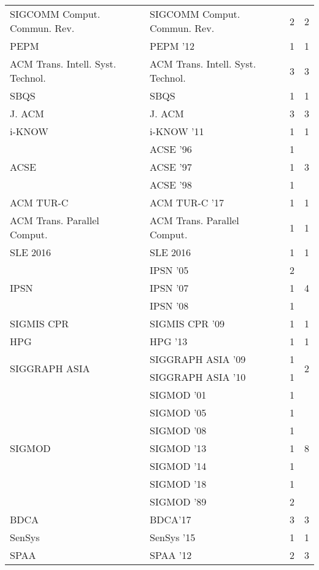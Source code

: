 \begin{table*}[t]
\begin{tabular}{llrr}
\multirow{1}{*}{SIGCOMM Comput. Commun. Rev.} & SIGCOMM Comput. Commun. Rev. & 2 & \multirow{1}{*}{2}\\
\multirow{1}{*}{PEPM } & PEPM '12 & 1 & \multirow{1}{*}{1}\\
\multirow{1}{*}{ACM Trans. Intell. Syst. Technol.} & ACM Trans. Intell. Syst. Technol. & 3 & \multirow{1}{*}{3}\\
\multirow{1}{*}{SBQS} & SBQS & 1 & \multirow{1}{*}{1}\\
\multirow{1}{*}{J. ACM} & J. ACM & 3 & \multirow{1}{*}{3}\\
\multirow{1}{*}{i-KNOW } & i-KNOW '11 & 1 & \multirow{1}{*}{1}\\
\multirow{3}{*}{ACSE } & ACSE '96 & 1 & \multirow{3}{*}{3}\\
& ACSE '97 & 1 &\\
& ACSE '98 & 1 &\\
\multirow{1}{*}{ACM TUR-C } & ACM TUR-C '17 & 1 & \multirow{1}{*}{1}\\
\multirow{1}{*}{ACM Trans. Parallel Comput.} & ACM Trans. Parallel Comput. & 1 & \multirow{1}{*}{1}\\
\multirow{1}{*}{SLE 2016} & SLE 2016 & 1 & \multirow{1}{*}{1}\\
\multirow{3}{*}{IPSN } & IPSN '05 & 2 & \multirow{3}{*}{4}\\
& IPSN '07 & 1 &\\
& IPSN '08 & 1 &\\
\multirow{1}{*}{SIGMIS CPR } & SIGMIS CPR '09 & 1 & \multirow{1}{*}{1}\\
\multirow{1}{*}{HPG } & HPG '13 & 1 & \multirow{1}{*}{1}\\
\multirow{2}{*}{SIGGRAPH ASIA } & SIGGRAPH ASIA '09 & 1 & \multirow{2}{*}{2}\\
& SIGGRAPH ASIA '10 & 1 &\\
\multirow{7}{*}{SIGMOD } & SIGMOD '01 & 1 & \multirow{7}{*}{8}\\
& SIGMOD '05 & 1 &\\
& SIGMOD '08 & 1 &\\
& SIGMOD '13 & 1 &\\
& SIGMOD '14 & 1 &\\
& SIGMOD '18 & 1 &\\
& SIGMOD '89 & 2 &\\
\multirow{1}{*}{BDCA} & BDCA'17 & 3 & \multirow{1}{*}{3}\\
\multirow{1}{*}{SenSys } & SenSys '15 & 1 & \multirow{1}{*}{1}\\
\multirow{2}{*}{SPAA } & SPAA '12 & 2 & \multirow{2}{*}{3}\\

\end{tabular}
\end{table*}
